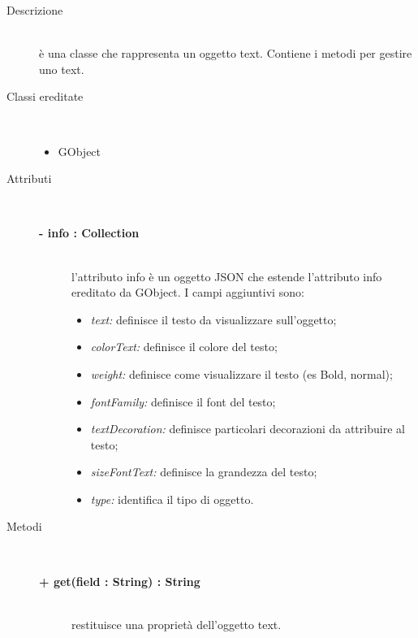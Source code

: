 \begin{description}
\item[Descrizione] \hfill \\
	è una classe che rappresenta un oggetto text. Contiene i metodi per gestire uno text.
	
\item[Classi ereditate] \hfill \\
	\begin{itemize}
		\item GObject
	\end{itemize}
	
\item[Attributi] \hfill \\
	\begin{description}
		\item[\textbf{- info : Collection			}] \hfill \\
			l'attributo info è un oggetto JSON che estende l'attributo info ereditato da GObject. I campi aggiuntivi sono:
	\begin{itemize}
		\item \textit{text:} definisce il testo da visualizzare sull'oggetto;
		\item \textit{colorText:} definisce il colore del testo;		
		\item \textit{weight:} definisce come visualizzare il testo (es Bold, normal); %
        \item \textit{fontFamily:} definisce il font del testo; %
        \item \textit{textDecoration:} definisce particolari decorazioni da attribuire al testo; %
        \item \textit{sizeFontText:} definisce la grandezza del testo; %
		\item \textit{type:} identifica il tipo di oggetto.		
	\end{itemize}
	\end{description}
	
\item[Metodi] \hfill \\

\begin{description}
		\item[\textbf{\color{blue}+ get(field : String) : String			}] \hfill \\
			restituisce una proprietà dell'oggetto text.
			

\end{description}
\end{description}

